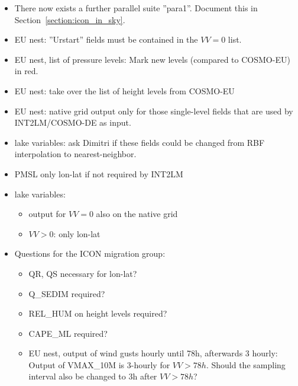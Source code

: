 \documentclass[a4paper,twoside,10pt]{book}
\begin{document}
\begin{itemize}
  \item  There now exists a further parallel suite ''para1''. 
         Document this in Section~\ref{section:icon_in_sky}.
  \item EU nest: ''Urstart'' fields must be contained in the $VV=0$ list.
  \item EU nest, list of pressure levels: Mark new levels (compared to COSMO-EU) in red.
  \item EU nest: take over the list of height levels from COSMO-EU
  \item EU nest: native grid output only for those single-level fields
    that are used by INT2LM/COSMO-DE as input.
  \item lake variables: ask Dimitri if these fields could be changed
    from RBF interpolation to nearest-neighbor.
  \item PMSL only lon-lat if not required by INT2LM
  \item lake variables: 
        \begin{itemize}
          \item output for $VV=0$ also on the native grid
          \item $VV>0$: only lon-lat
          \end{itemize}
  \item Questions for the ICON migration group:
        \begin{itemize}
          \item QR, QS necessary for lon-lat?
          \item Q\_SEDIM required?
          \item REL\_HUM on height levels required?
          \item CAPE\_ML required?
          \item EU nest, output of wind gusts hourly until 78h,
            afterwards 3 hourly:  Output of VMAX\_10M is 3-hourly for
            $VV>78h$. Should the sampling interval also be changed to
            3h after $VV>78h$?
        \end{itemize}
\end{itemize}
\end{document}
